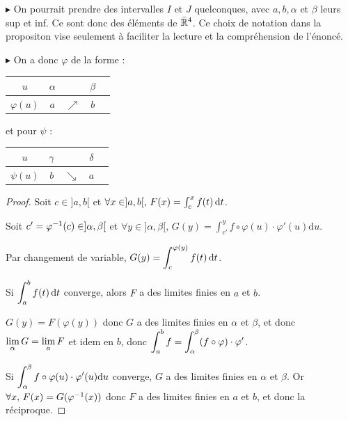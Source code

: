 \begin{remarque}
    $\blacktriangleright$ On pourrait prendre des intervalles $I$ et $J$ quelconques, 
    avec $a, b, \alpha$ et $\beta$ leurs sup et inf. Ce sont donc des éléments de $\bar {\mathbb{R}}^4$.
    Ce choix de notation dans la propositon vise seulement à faciliter la lecture et la compréhension de l'énoncé.

    \avspace $\blacktriangleright$ On a donc $\varphi$ de la forme :  
    \begin{center}
        \begin{tabular}{c|c c c c}
            $u$ & $\alpha$ &  & $\beta$ \\
            \hline
            $\varphi(u)$ & $a$ & $\nearrow$ &$b$ \\
        \end{tabular}
    \end{center}

    et pour $\psi$ :
    \begin{center}
        \begin{tabular}{c|c c c c}
            $u$ & $\gamma$ &  & $\delta$ \\
            \hline
            $\psi(u)$ & $b$ & $\searrow$ &$a$ \\
        \end{tabular}
    \end{center}
\end{remarque}


\begin{proof}
    Soit $c \in ]a, b[$ et $\forall x \in ]a, b[, \, F(x) = \int_c^x f(t) \,\mathrm{d}t$.

    Soit $c' = \varphi ^{-1} (c) \in ]\alpha, \beta[$ et 
    $\forall y \in ] \alpha, \beta[, \, G(y) = \int_{c'}^y f \circ \varphi(u) \cdot \varphi'(u) \mathrm d u$.

    Par changement de variable, $G(y) = \displaystyle \int_c^{\varphi(y)} f(t) \,\mathrm{d}t$. 

    Si $\displaystyle \int_{a }^{b } f(t) \,\mathrm{d}t$ converge, alors $F$ a des limites finies en $a$ et $b$.

    $G(y) = F(\varphi(y))$ donc $G$ a des limites finies en $\alpha$ et $\beta$, et donc 
    $\displaystyle \lim_\alpha G = \lim_a F$ et idem en $b$, donc 
    $\displaystyle \int_{a }^{b } f = \int_\alpha^\beta (f \circ \varphi) \cdot \varphi'$.

    Si $\displaystyle \int_{\alpha }^{\beta } f \circ \varphi(u) \cdot \varphi'(u) \mathrm d u$ converge,
    $G$ a des limites finies en $\alpha$ et $\beta$. Or $\forall x, \, F(x) = G(\varphi ^{-1} (x))$ donc $F$ a des limites finies en $a$ et $b$, et
    donc la réciproque. 
\end{proof}


